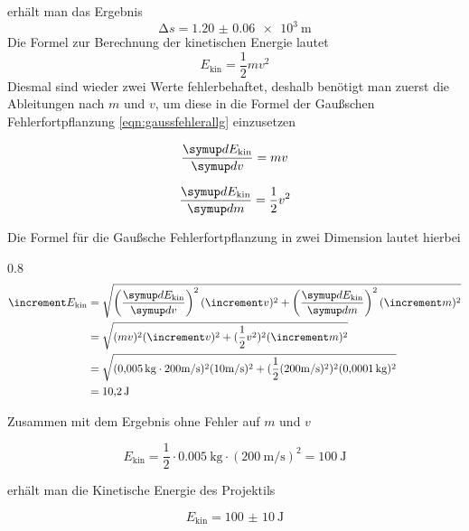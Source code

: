 erhält man das Ergebnis
\begin{equation}
\increment s = \SI{1.20(6)e3}{\meter}
\end{equation}
Die Formel zur Berechnung der kinetischen Energie lautet
\begin{equation}
E_\text{kin} = \frac{1}{2} m v^2
\end{equation}
Diesmal sind wieder zwei Werte fehlerbehaftet, deshalb benötigt man zuerst die Ableitungen nach $m$ und $v$, um diese in
die Formel der Gaußschen Fehlerfortpflanzung \eqref{eqn:gaussfehlerallg} einzusetzen

\begin{minipage}[t]{0.4\textwidth}
\begin{equation}
\frac{\dif{E_\text{kin}}}{\dif{v}} = m v
\end{equation}
\end{minipage}
\begin{minipage}[t]{0.4\textwidth}
\begin{equation}
\frac{\dif{E_\text{kin}}}{\dif{m}} = \frac{1}{2} v^2
\end{equation}
\end{minipage}

\begin{flushleft}
Die Formel für die Gaußsche Fehlerfortpflanzung in zwei Dimension lautet hierbei
\end{flushleft}
\begin{spreadlines}{0.8\baselineskip}
\begin{align}
\increment E_\text{kin} &= \sqrt{ \left( \frac{\dif{E_\text{kin}}}{\dif{v}} \right)^2 (\increment v)^2 + \left( \frac{\dif{E_\text{kin}}}{\dif{m}} \right)^2 (\increment m)^2} \\
                        &= \sqrt{ (m v)^2 (\increment v)^2 + (\frac{1}{2} v^2)^2 (\increment m)^2}\\
                        &= \sqrt{ (\SI{0{,}005}{\kilo\gram} \cdot 200 \si[per-mode=symbol]{\meter\per\second})^2 (10\si[per-mode=symbol]{\meter\per\second})^2 + (\frac{1}{2} (200 \si[per-mode=symbol]{\meter\per\second})^2)^2 (\SI{0.0001}{\kilo\gram})^2}\\
                        &= \SI{10.2}{\joule}
\end{align}
\end{spreadlines}

\begin{flushleft}
Zusammen mit dem Ergebnis ohne Fehler auf $m$ und $v$
\end{flushleft}
\begin{equation}
E_\text{kin} = \frac{1}{2} \cdot \SI{0.005}{\kilo\gram} \cdot \left( \SI{200}{\meter\per\second} \right)^2 = \SI{100}{\joule}
\end{equation}

\begin{flushleft}
erhält man die Kinetische Energie des Projektils
\end{flushleft}
\begin{equation}
E_\text{kin} = \SI{100(10)}{\joule}
\end{equation}
